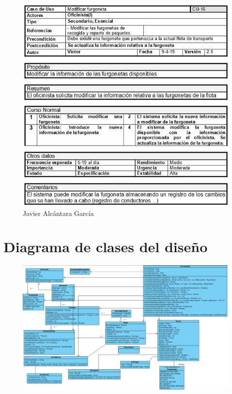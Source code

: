 \begin{figure}[H]
	\centering
	\includegraphics[width=16cm]{16}
	\caption{Javier Alcántara García}
\end{figure}
\newpage

\section{Diagrama de clases del diseño}
\begin{figure}[H]
	\centering
	\includegraphics[width=16cm]{clases}
\end{figure}

